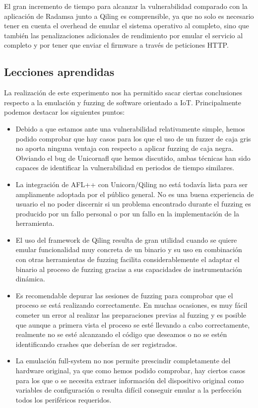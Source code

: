 El gran incremento de tiempo para alcanzar la vulnerabilidad comparado con la aplicación de Radamsa junto a Qiling es comprensible, ya que 
no solo es necesario tener en cuenta el overhead de emular el sistema operativo al completo, sino que también las penalizaciones adicionales 
de rendimiento por emular el servicio al completo y por tener que enviar el firmware a través de peticiones HTTP.

\subsection{Lecciones aprendidas}
La realización de este experimento nos ha permitido sacar ciertas conclusiones respecto a la emulación y fuzzing de software orientado a IoT.
Principalmente podemos destacar los siguientes puntos:
\begin{itemize}
    \item Debido a que estamos ante una vulnerabilidad relativamente simple, hemos podido comprobar que hay casos para los que el uso de un 
    fuzzer de caja gris no aporta ninguna ventaja con respecto a aplicar fuzzing de caja negra. Obviando el bug de Unicornafl que hemos
    discutido, ambas técnicas han sido capaces de identificar la vulnerabilidad en periodos de tiempo similares.
    \item La integración de AFL++ con Unicorn/Qiling no está todavía lista para ser ampliamente adoptada por el público general. No es una 
    buena experiencia de usuario el no poder discernir si un problema encontrado durante el fuzzing es producido por un fallo personal 
    o por un fallo en la implementación de la herramienta.
    \item El uso del framework de Qiling resulta de gran utilidad cuando se quiere emular funcionalidad muy concreta de un binario y su 
    uso en combinación con otras herramientas de fuzzing facilita considerablemente el adaptar el binario al proceso de fuzzing gracias a 
    sus capacidades de instrumentación dinámica.
    \item Es recomendable depurar las sesiones de fuzzing para comprobar que el proceso se está realizando correctamente. En muchas ocasiones,
    es muy fácil cometer un error al realizar las preparaciones previas al fuzzing y es posible que aunque a primera vista el proceso se esté 
    llevando a cabo correctamente, realmente no se esté alcanzando el código que deseamos o no se estén identificando crashes que deberían de 
    ser registrados.
    \item La emulación full-system no nos permite prescindir completamente del hardware original, ya que como hemos podido comprobar, hay ciertos 
    casos para los que o se necesita extraer información del dispositivo original como variables de configuración o resulta difícil conseguir 
    emular a la perfección todos los periféricos requeridos.
\end{itemize}

